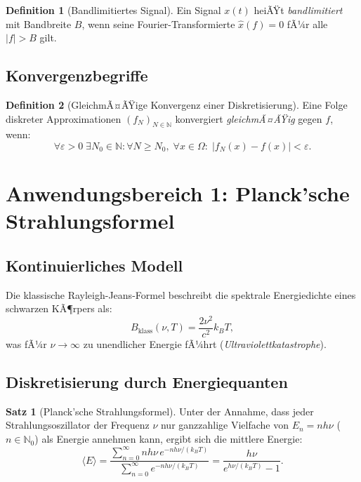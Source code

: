 ﻿\documentclass[a4paper,12pt]{article}
\theoremstyle{definition}
\newtheorem{definition}{Definition}
\newtheorem{satz}{Satz}
\begin{document}
\begin{definition}[Bandlimitiertes Signal]
    Ein Signal $x(t)$ heiÃŸt \emph{bandlimitiert} mit Bandbreite $B$, wenn seine Fourier-Transformierte $\hat{x}(f) = 0$ fÃ¼r alle $|f| > B$ gilt.
\end{definition}

\subsection{Konvergenzbegriffe}

\begin{definition}[GleichmÃ¤ÃŸige Konvergenz einer Diskretisierung]
    Eine Folge diskreter Approximationen $(f_N)_{N\in\mathbb{N}}$ konvergiert \emph{gleichmÃ¤ÃŸig} gegen $f$, wenn:
    \[
    \forall \varepsilon > 0\;\exists N_0 \in \mathbb{N} : \forall N \geq N_0,\;\forall x \in \Omega:\;|f_N(x) - f(x)| < \varepsilon.
    \]
\end{definition}

\section{Anwendungsbereich 1: Planck'sche Strahlungsformel}

\subsection{Kontinuierliches Modell}

Die klassische Rayleigh-Jeans-Formel beschreibt die spektrale Energiedichte eines schwarzen KÃ¶rpers als:
\[
B_{\text{klass}}(\nu, T) = \frac{2\nu^2}{c^2} k_B T,
\]
was fÃ¼r $\nu \to \infty$ zu unendlicher Energie fÃ¼hrt (\emph{Ultraviolettkatastrophe}).

\subsection{Diskretisierung durch Energiequanten}

\begin{satz}[Planck'sche Strahlungsformel]
    Unter der Annahme, dass jeder Strahlungsoszillator der Frequenz $\nu$ nur ganzzahlige Vielfache von $E_n = n h \nu$ ($n \in \mathbb{N}_0$) als Energie annehmen kann, ergibt sich die mittlere Energie:
    \[
    \langle E \rangle = \frac{\sum_{n=0}^\infty n h\nu \, e^{-nh\nu/(k_BT)}}{\sum_{n=0}^\infty e^{-nh\nu/(k_BT)}} = \frac{h\nu}{e^{h\nu/(k_BT)} - 1}.
    \]
\end{satz}
\end{document}
